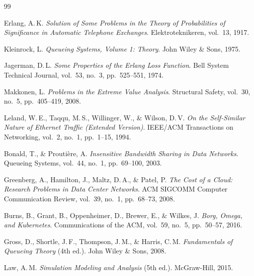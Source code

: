 \documentclass[12pt,a4paper]{article}
\theoremstyle{definition}
\theoremstyle{plain}
\theoremstyle{remark}
\begin{document}
\begin{thebibliography}{99}

Erlang, A.\,K.
\textit{Solution of Some Problems in the Theory of Probabilities of Significance in
Automatic Telephone Exchanges}.
Elektroteknikeren, vol.\ 13, 1917.

Kleinrock, L.
\textit{Queueing Systems, Volume 1: Theory}.
John Wiley \& Sons, 1975.

Jagerman, D.\,L.
\textit{Some Properties of the Erlang Loss Function}.
Bell System Technical Journal, vol.\ 53, no.\ 3, pp.\ 525--551, 1974.

Makkonen, L.
\textit{Problems in the Extreme Value Analysis}.
Structural Safety, vol.\ 30, no.\ 5, pp.\ 405--419, 2008.

Leland, W.\,E., Taqqu, M.\,S., Willinger, W., \& Wilson, D.\,V.
\textit{On the Self-Similar Nature of Ethernet Traffic (Extended Version)}.
IEEE/ACM Transactions on Networking, vol.\ 2, no.\ 1, pp.\ 1--15, 1994.

Bonald, T., \& Proutière, A.
\textit{Insensitive Bandwidth Sharing in Data Networks}.
Queueing Systems, vol.\ 44, no.\ 1, pp.\ 69--100, 2003.

Greenberg, A., Hamilton, J., Maltz, D.\,A., \& Patel, P.
\textit{The Cost of a Cloud: Research Problems in Data Center Networks}.
ACM SIGCOMM Computer Communication Review, vol.\ 39, no.\ 1, pp.\ 68--73, 2008.

Burns, B., Grant, B., Oppenheimer, D., Brewer, E., \& Wilkes, J.
\textit{Borg, Omega, and Kubernetes}.
Communications of the ACM, vol.\ 59, no.\ 5, pp.\ 50--57, 2016.

Gross, D., Shortle, J.\,F., Thompson, J.\,M., \& Harris, C.\,M.
\textit{Fundamentals of Queueing Theory} (4th ed.).
John Wiley \& Sons, 2008.

Law, A.\,M.
\textit{Simulation Modeling and Analysis} (5th ed.).
McGraw-Hill, 2015.

\end{thebibliography}
\end{document}
